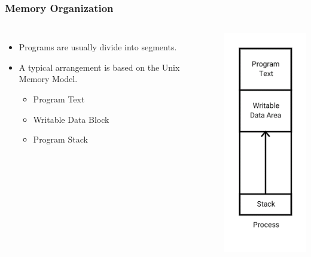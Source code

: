 \documentclass{beamer}
\begin{document}
\begin{frame}
    \frametitle{Memory Organization}
    \begin{columns}
        \begin{itemize}
            \item Programs are usually divide into segments.
            \item A typical arrangement is based on the Unix Memory Model.
            \begin{itemize}
                \item Program Text
                \item Writable Data Block
                \item Program Stack
            \end{itemize}
            
        \end{itemize}
        
        \begin{center}
           \includegraphics[height=0.8\textheight]{images/unixmem}
        \end{center}
    \end{columns}
\end{frame}
\end{document}
